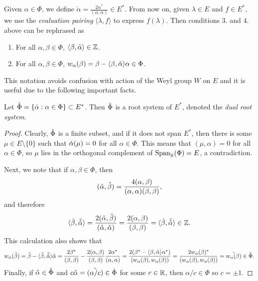 Given $\alpha\in\Phi$, we define $\check{\alpha}=\frac{2\alpha^*}{(\alpha,\alpha)}\in E^*$. From now on, given $\lambda\in E$ and $f\in E^*$, we use the \textit{evaluation pairing} $\langle\lambda,f\rangle$ to express $f(\lambda)$. Then conditions $3.$ and $4.$ above can be rephrased as
\begin{enumerate}[start=3]
    \item For all $\alpha,\beta\in\Phi$, $\langle\beta,\check{\alpha}\rangle\in\mathbb{Z}$.
    \item For all $\alpha,\beta\in\Phi$, $w_\alpha(\beta)=\beta-\langle\beta,\check{\alpha}\rangle\alpha\in\Phi$.
\end{enumerate}

This notation avoids confusion with action of the Weyl group $W$ on $E$ and it is useful due to the following important facts.

\begin{lemma}
    Let $\check{\Phi}=\{\check{\alpha}:\alpha\in\Phi\}\subset E^*$. Then $\check{\Phi}$ is a root system of $E^*$, denoted the \textit{dual root system}.
\end{lemma}
\begin{proof}
    Clearly, $\check{\Phi}$ is a finite subset, and if it does not span $E^*$, then there is some $\mu\in E\setminus\{0\}$ such that $\check{\alpha}(\mu)=0$ for all $\alpha\in\Phi$. This means that $(\mu,\alpha)=0$ for all $\alpha\in\Phi$, so $\mu$ lies in the orthogonal complement of $\mathrm{Span}_{\mathbb{R}}(\Phi)=E$, a contradiction.

    Next, we note that if $\alpha,\beta\in\Phi$, then 
    $$(\check{\alpha},\check{\beta})=\frac{4(\alpha,\beta)}{(\alpha,\alpha)(\beta,\beta)},$$
    and therefore 
    $$\langle\check{\beta},\check{\check{\alpha}}\rangle=\frac{2(\check{\alpha},\check{\beta})}{(\check{\alpha},\check{\alpha})}=\frac{2(\alpha,\beta)}{(\beta,\beta)}=\langle\check{\beta},\check{\check{\alpha}}\rangle\in \mathbb{Z}.$$
    This calculation also shows that 
    $$w_{\check{\alpha}}(\check{\beta})=\check{\beta}-\langle\check{\beta},\check{\check{\alpha}}\rangle\check{\alpha}=\frac{2\beta^*}{(\beta,\beta)}-\frac{2(\alpha,\beta)}{(\beta,\beta)}\frac{2\alpha^*}{(\alpha,\alpha)}=\frac{2(\beta^*-\langle\beta,\check{\alpha}\rangle\alpha^*)}{(w_\alpha(\beta),w_\alpha(\beta))}=\frac{2w_\alpha(\beta)^*}{(w_\alpha(\beta),w_\alpha(\beta))}=\check{w_\alpha(\beta)}\in\check{\Phi}.$$
    Finally, if $\check{\alpha}\in\check{\Phi}$ and $c\check{\alpha}=\check{(\alpha/c)}\in\check{\Phi}$ for some $c\in\mathbb{R}$, then $\alpha/c\in\Phi$ so $c=\pm1$.
\end{proof}

